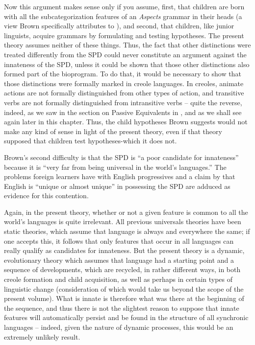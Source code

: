 Now this argument makes sense only if you assume, first, that
children are born with all the subcategorization features of an \textit{Aspects} grammar in their heads (a view Brown specifically attributes to \citealt{McNeill1966}), and second, that children, like junior linguists, acquire grammars by formulating and testing hypotheses. The present theory assumes neither of these things. Thus, the fact that other distinctions were treated differently from the SPD could never constitute an argument against the innateness of the SPD, unless it could be shown that those other distinctions also formed part of the bioprogram. To do that, it would be necessary to show that those distinctions were formally marked in creole languages. In creoles, animate actions are not formally distinguished from other types of action, and transitive verbs are not formally distinguished from intransitive verbs -- quite the reverse, indeed, as we saw in the section on Passive Equivalents in , and as we shall see again later in this chapter. Thus, the child hy\-potheses Brown suggests would not make any kind of sense in light of the present theory, even if that theory supposed that children test hypotheses-which it does not.

Brown's second difficulty is that the SPD is ``a poor candidate for innateness'' because it is ``very far from being universal in the world's languages.'' The problems foreign learners have with English progressives and a claim by \citet{Joos1964} that English is ``unique or almost unique'' in possessing the SPD are adduced as evidence for this contention.

Again, in the present theory, whether or not a given feature is common to all the world's languages is quite irrelevant. All previous universals theories have been static theories, which assume that lan\-guage is always and everywhere the same; if one accepts this, it follows that only features that occur in all languages can really qualify as can\-didates for innateness. But the present theory is a dynamic, evolu\-tionary theory which assumes that language had a starting point and a sequence of developments, which are recycled, in rather different ways, in both creole formation and child acquisition, as well as perhaps in certain types of linguistic change (consideration of which would take us beyond the scope of the present volume). What is innate is therefore
what was there at the beginning of the sequence, and thus there is not the slightest reason to suppose that innate features will automati\-cally persist and be found in the structure of all synchronic languages -- indeed, given the nature of dynamic processes, this would be an extremely unlikely result.

